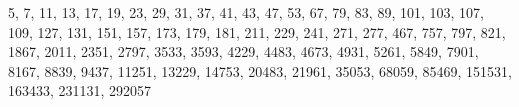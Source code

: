 5, 7, 11, 13, 17, 19, 23, 29, 31, 37, 41, 43, 47, 53, 67, 79, 83, 89, 101, 103, 107, 109, 127, 131, 151, 157, 173, 179, 181, 211, 229, 241, 271, 277, 467, 757, 797, 821, 1867, 2011, 2351, 2797, 3533, 3593, 4229, 4483, 4673, 4931, 5261, 5849, 7901, 8167, 8839, 9437, 11251, 13229, 14753, 20483, 21961, 35053, 68059, 85469, 151531, 163433, 231131, 292057